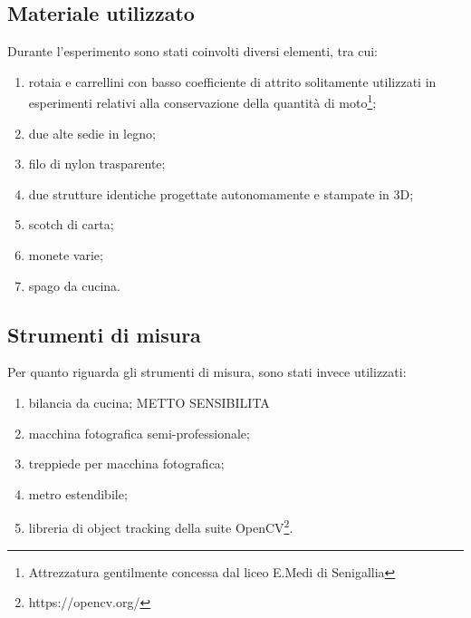 \documentclass[11pt, a4paper, twoside]{article}
\begin{document}
\subsection{Materiale utilizzato}

Durante l'esperimento sono stati coinvolti diversi elementi, tra cui:
\begin{enumerate}
      \item rotaia e carrellini con basso coefficiente di attrito solitamente
      utilizzati in esperimenti relativi alla conservazione della quantità
      di moto\footnote{Attrezzatura gentilmente concessa dal liceo E.Medi di Senigallia};
      \item due alte sedie in legno;
      \item filo di nylon trasparente;
      \item due strutture identiche progettate autonomamente e stampate in 3D;
      \item scotch di carta;
      \item monete varie;
      \item spago da cucina.
\end{enumerate}

\subsection{Strumenti di misura}

Per quanto riguarda gli strumenti di misura, sono stati invece utilizzati:
\begin{enumerate}
  \item bilancia da cucina;  METTO SENSIBILITA
  \item macchina fotografica semi-professionale;
  \item treppiede per macchina fotografica;
  \item metro estendibile;
  \item libreria di object tracking della suite OpenCV\footnote{https://opencv.org/}.
\end{enumerate}
\end{document}
